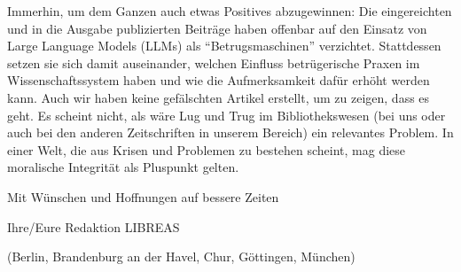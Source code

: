 \documentclass[a4paper,
fontsize=11pt,
oneside,
numbers=noperiodatend,
parskip=half-,
bibliography=totoc,
final
]{scrartcl}
\begin{document}
Immerhin, um dem Ganzen auch etwas Positives abzugewinnen: Die
eingereichten und in die Ausgabe publizierten Beiträge haben offenbar
auf den Einsatz von Large Language Models (LLMs) als
\enquote{Betrugsmaschinen} verzichtet. Stattdessen setzen sie sich damit
auseinander, welchen Einfluss betrügerische Praxen im
Wissenschaftssystem haben und wie die Aufmerksamkeit dafür erhöht werden
kann. Auch wir haben keine gefälschten Artikel erstellt, um zu zeigen,
dass es geht. Es scheint nicht, als wäre Lug und Trug im
Bibliothekswesen (bei uns oder auch bei den anderen Zeitschriften in
unserem Bereich) ein relevantes Problem. In einer Welt, die aus Krisen
und Problemen zu bestehen scheint, mag diese moralische Integrität als
Pluspunkt gelten.

Mit Wünschen und Hoffnungen auf bessere Zeiten

Ihre/Eure Redaktion LIBREAS

(Berlin, Brandenburg an der Havel, Chur, Göttingen, München)

\end{document}
